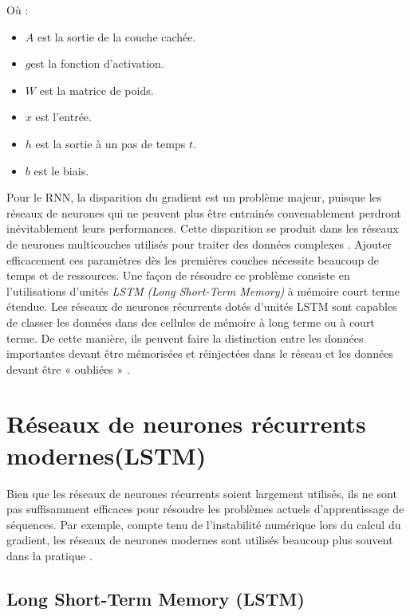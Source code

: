 Où :
\begin{itemize}
  \item \( A \) est la sortie de la couche cachée.
  \item \( g\)est la fonction d’activation.
  \item \( W \) est la matrice de poids.
  \item \( x \) est l’entrée.
  \item \( h \) est la sortie à un pas de temps \( t \).
  \item \( b \) est le biais.
\end{itemize}

Pour le RNN, la disparition du gradient est un problème majeur, puisque les réseaux de neurones qui ne peuvent plus être entrainés convenablement perdront inévitablement leurs performances. Cette disparition se produit dans les réseaux de neurones multicouches utilisés pour traiter des données complexes \cite{salehinejad2018recent}. Ajouter efficacement ces paramètres dès les premières couches nécessite beaucoup de temps et de ressources. Une façon de résoudre ce problème consiste en l’utilisations d’unités \textit{LSTM} \textit{(Long Short-Term Memory)} à mémoire court terme étendue. Les réseaux de neurones récurrents dotés d’unités LSTM sont capables de classer les données dans des cellules de mémoire à long terme ou à court terme. De cette manière, ils peuvent faire la distinction entre les données importantes devant être mémorisées et réinjectées dans le réseau et les données devant être « oubliées » \cite{salehinejad2018recent}.



\section{Réseaux de neurones récurrents modernes(LSTM)}
Bien que les réseaux de neurones récurrents soient largement utilisés, ils ne sont pas suffisamment efficaces pour résoudre les problèmes actuels d'apprentissage de séquences. Par exemple, compte tenu de l'instabilité numérique lors du calcul du gradient, les réseaux de neurones modernes sont utilisés beaucoup plus souvent dans la pratique \cite{salehinejad2018recent}. \par
\subsection{Long Short-Term Memory (LSTM) }

